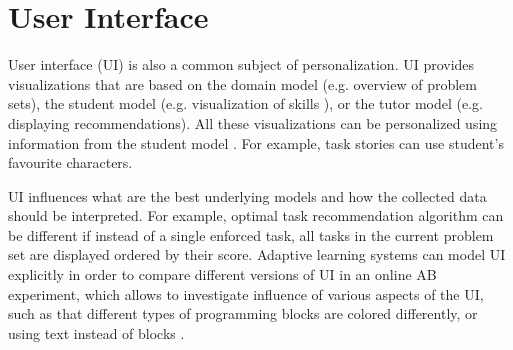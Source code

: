 %



\section{User Interface}
\label{sec:user-interface}


User interface (UI) is also a common subject of personalization. %
UI provides visualizations that are based on
the domain model (e.g. overview of problem sets),
the student model (e.g. visualization of skills \cite{open-learner-model}),
or the tutor model (e.g. displaying recommendations). %
All these visualizations can be personalized using
information from the student model
\cite[chapter 9]{its-domain-models}.
For example,
task stories can use student's favourite characters. %

UI influences what are the best underlying models
and how the collected data should be interpreted.
For example, optimal task recommendation algorithm can be
different if instead of a single enforced task,
all tasks in the current problem set are displayed ordered by their score.
Adaptive learning systems can model UI explicitly in order to compare different versions
of UI in an online AB experiment,
which allows to investigate influence of various aspects of
the UI, such as that different types of programming blocks are colored differently,
or using text instead of blocks %
\cite{comparing-blocks-text-weintrop2017}.

